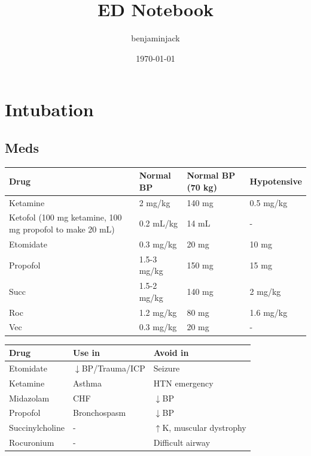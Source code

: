 \documentclass[8pt]{extarticle}
\title{ED Notebook}
\author{benjaminjack}
\date{\today}
\begin{document}
\maketitle
\newpage

\tableofcontents
\newpage

\section{Intubation}
\subsection{Meds}

\begin{tabularx}{\linewidth}{|X|X|X|X|}
\hline
\textbf{Drug} & \textbf{Normal BP} & \textbf{Normal BP (70 kg)} & \textbf{Hypotensive} \\
\hline

Ketamine & 2 mg/kg & 140 mg & 0.5 mg/kg  \\
\hline
Ketofol (100 mg ketamine, 100 mg propofol to make 20 mL) & 0.2 mL/kg & 14 mL & - \\
\hline
Etomidate & 0.3 mg/kg & 20 mg & 10 mg \\
\hline
Propofol & 1.5-3 mg/kg & 150 mg & 15 mg \\
\hline
Succ & 1.5-2 mg/kg & 140 mg & 2 mg/kg \\
\hline
Roc & 1.2 mg/kg & 80 mg & 1.6 mg/kg \\
\hline
Vec & 0.3 mg/kg & 20 mg & - \\
\hline
\end{tabularx}

\vfill

\begin{tabularx}{\linewidth}{|X|X|X|}
\hline
\textbf{Drug} & \textbf{Use in} & \textbf{Avoid in} \\
\hline

Etomidate & $\downarrow$BP/Trauma/ICP & Seizure  \\
\hline
Ketamine & Asthma & HTN emergency  \\
\hline
Midazolam & CHF & $\downarrow$BP  \\
\hline
Propofol & Bronchospasm & $\downarrow$BP  \\
\hline
Succinylcholine & - & $\uparrow$K, muscular dystrophy \\
\hline
Rocuronium & - & Difficult airway \\
\hline
\end{tabularx}
\end{document}
